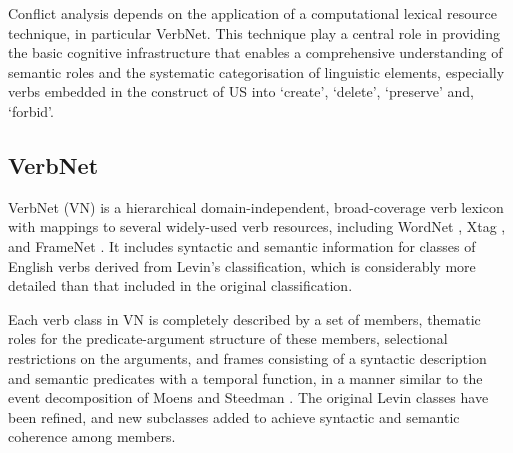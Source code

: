 Conflict analysis depends on the application of a computational lexical resource technique, in particular VerbNet. This technique play a central role in providing the basic cognitive infrastructure that enables a comprehensive understanding of semantic roles and the systematic categorisation of linguistic elements, especially verbs embedded in the construct of US into ‘create’, ‘delete’, ‘preserve’ and, ‘forbid’. 
\subsection*{VerbNet} \label{verbnet}
VerbNet (VN) is a hierarchical domain-independent, broad-coverage verb lexicon with mappings to several widely-used verb resources, including WordNet \cite{miller1995wordnet}, Xtag \cite{prolo2002generating}, and FrameNet \cite{baker1998berkeley}. It includes syntactic and semantic information for classes of English verbs derived from Levin’s classification, which is considerably more detailed than that included in the original classification. 

Each verb class in VN is completely described by a set of members, thematic roles for the predicate-argument structure of these members, selectional restrictions on the arguments, and frames consisting of a syntactic description and semantic predicates with a temporal function, in a manner similar to the event decomposition of Moens and Steedman \cite{moens2005temporal}. The original Levin classes have been refined, and new subclasses added to achieve syntactic and semantic coherence among members.


